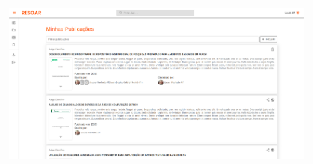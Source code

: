 \begin{table}[H]
\begin{tabular}{|p{1cm}|p{14cm}|}
        \multicolumn{2}{|c|}{\includegraphics[scale=0.294]{img/resoar-my-research.png}}                                                                                                                                                                                                                                                                                                             \\ \hline
    \end{tabular}
\end{table}

